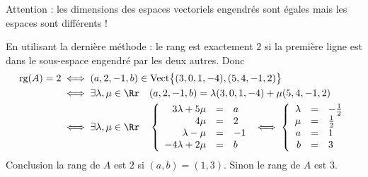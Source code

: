 {{\begin{itemize}
Attention : les dimensions des espaces vectoriels engendrés sont égales mais les espaces sont différents !
  \end{itemize}
En utilisant la dernière méthode : le rang est exactement $2$ si la première ligne est dans le sous-espace engendré
par les deux autres.
Donc 
\begin{align*}
\textrm{rg}(A) = 2
 & \iff (a,2,-1,b) \in \textrm{Vect} \big\{ (3,0,1,-4), (5,4,-1,2) \big\} \\
 & \iff \exists \lambda,\mu \in \Rr \quad (a,2,-1,b) = \lambda (3,0,1,-4) + \mu(5,4,-1,2) \\
 & \iff \exists \lambda,\mu \in \Rr \quad 
\left\{
\begin{array}{rcl}
3\lambda+5\mu &=& a \\
4\mu &=& 2 \\
\lambda-\mu &=& -1 \\
-4\lambda+2\mu &=& b \\
\end{array}
\right. 
 \iff  \left\{
\begin{array}{rcl}
\lambda &=& -\frac12 \\
\mu &=& \frac12 \\
a &=& 1 \\
b &=& 3 \\
\end{array} 
\right.\\  
\end{align*}
Conclusion la rang de $A$ est $2$ si $(a,b)=(1,3)$. Sinon le rang de $A$ est $3$.
}
}
